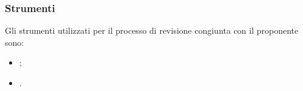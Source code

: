 \subsubsection{Strumenti}
Gli strumenti utilizzati per il processo di revisione congiunta con il proponente sono:
\begin{itemize}
    \item {};
    \item {}.
\end{itemize}